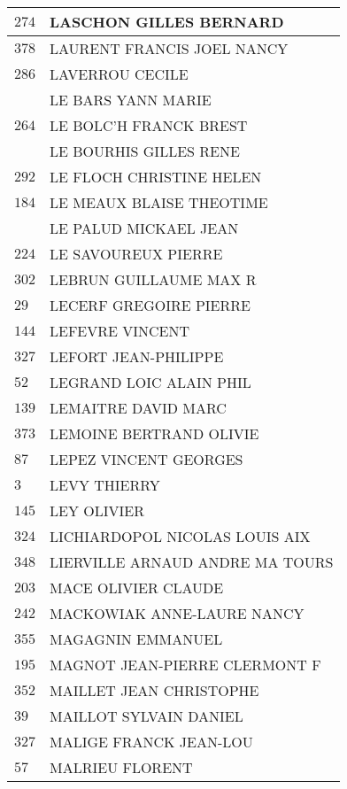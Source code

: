 \begin{xltabular}{\linewidth}{|l|X|}
    \hline
    $274$ & LASCHON GILLES BERNARD \\
    \hline
    $378$ & LAURENT FRANCIS JOEL NANCY \\
    \hline
    $286$ & LAVERROU CECILE \\
    \hline
    & LE BARS YANN MARIE \\
    \hline
    $264$ & LE BOLC'H FRANCK BREST \\
    \hline
    & LE BOURHIS GILLES RENE \\
    \hline
    $292$ & LE FLOCH CHRISTINE HELEN \\
    \hline
    $184$ & LE MEAUX BLAISE THEOTIME \\
    \hline
    & LE PALUD MICKAEL JEAN \\
    \hline
    $224$ & LE SAVOUREUX PIERRE \\
    \hline
    $302$ & LEBRUN GUILLAUME MAX R \\
    \hline
    $29$ & LECERF GREGOIRE PIERRE \\
    \hline
    $144$ & LEFEVRE VINCENT \\
    \hline
    $327$ & LEFORT JEAN-PHILIPPE \\
    \hline
    $52$ & LEGRAND LOIC ALAIN PHIL \\
    \hline
    $139$ & LEMAITRE DAVID MARC \\
    \hline
    $373$ & LEMOINE BERTRAND OLIVIE \\
    \hline
    $87$ & LEPEZ VINCENT GEORGES \\
    \hline
    $3$ & LEVY THIERRY \\
    \hline
    $145$ & LEY OLIVIER \\
    \hline
    $324$ & LICHIARDOPOL NICOLAS LOUIS AIX \\
    \hline
    $348$ & LIERVILLE ARNAUD ANDRE MA TOURS \\
    \hline
    $203$ & MACE OLIVIER CLAUDE \\
    \hline
    $242$ & MACKOWIAK ANNE-LAURE NANCY \\
    \hline
    $355$ & MAGAGNIN EMMANUEL \\
    \hline
    $195$ & MAGNOT JEAN-PIERRE CLERMONT F \\
    \hline
    $352$ & MAILLET JEAN CHRISTOPHE \\
    \hline
    $39$ & MAILLOT SYLVAIN DANIEL \\
    \hline
    $327$ & MALIGE FRANCK JEAN-LOU \\
    \hline
    $57$ & MALRIEU FLORENT \\

\end{xltabular}
